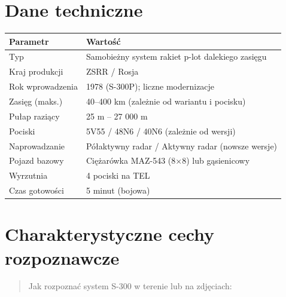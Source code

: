 \documentclass[12pt,openany,oneside]{book}
\begin{document}
\section{Dane techniczne}\label{dane-techniczne-27}

\begin{longtable}[]{@{}ll@{}}
\toprule\noalign{}
Parametr & Wartość \\
\midrule\noalign{}
\endhead
\bottomrule\noalign{}
\endlastfoot
Typ & Samobieżny system rakiet p-lot dalekiego zasięgu \\
Kraj produkcji & ZSRR / Rosja \\
Rok wprowadzenia & 1978 (S-300P); liczne modernizacje \\
Zasięg (maks.) & 40--400 km (zależnie od wariantu i pocisku) \\
Pułap raziący & 25 m -- 27 000 m \\
Pociski & 5V55 / 48N6 / 40N6 (zależnie od wersji) \\
Naprowadzanie & Półaktywny radar / Aktywny radar (nowsze wersje) \\
Pojazd bazowy & Ciężarówka MAZ-543 (8×8) lub gąsienicowy \\
Wyrzutnia & 4 pociski na TEL \\
Czas gotowości & 5 minut (bojowa) \\
\end{longtable}

\section{Charakterystyczne cechy
rozpoznawcze}\label{charakterystyczne-cechy-rozpoznawcze-27}

\begin{quote}
Jak rozpoznać system S-300 w terenie lub na zdjęciach:
\end{quote}
\end{document}
